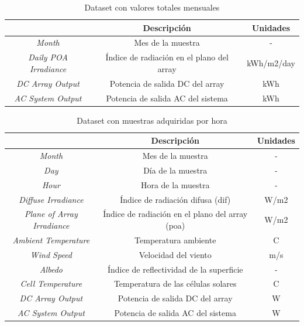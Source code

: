 \begin{table}[h!]
    \centering
    \begin{tabular}{|c|c|c|}
    \hline
    \rowcolor[HTML]{AAAAAA} 
    \multicolumn{1}{|c|}{\cellcolor[HTML]{AAAAAA}Campo} & \multicolumn{1}{c|}{\cellcolor[HTML]{AAAAAA}Descripción} & Unidades \\ \hline
    \textit{Month} & Mes de la muestra & - \\ \hline
    \textit{Daily POA Irradiance} & Índice de radiación en el plano del array & kWh/m2/day \\ \hline 
    \textit{DC Array Output} & Potencia de salida DC del array & kWh \\ \hline
    \textit{AC System Output} & Potencia de salida AC del sistema & kWh \\ \hline
    \end{tabular}
    \caption{Dataset con valores totales mensuales \cite{pvwatts}}
    \label{tab:pvwattsdataset2}
\end{table}

\vspace{1mm}

\begin{table}[h!]
    \centering
    \begin{tabular}{|c|c|c|}
    \hline
    \rowcolor[HTML]{AAAAAA} 
    \multicolumn{1}{|c|}{\cellcolor[HTML]{AAAAAA}Campo} & \multicolumn{1}{c|}{\cellcolor[HTML]{AAAAAA}Descripción} & Unidades \\ \hline
    \textit{Month} & Mes de la muestra & - \\ \hline
    \textit{Day} & Día de la muestra & - \\ \hline
    \textit{Hour} & Hora de la muestra & - \\ \hline
    \textit{Diffuse Irradiance} & Índice de radiación difusa (\gls{dif}) & W/m2 \\ \hline
    \textit{Plane of Array Irradiance} & Índice de radiación en el plano del array (\acrshort{poa}) & W/m2 \\ \hline 
    \textit{Ambient Temperature} & Temperatura ambiente & C \\ \hline
    \textit{Wind Speed} & Velocidad del viento & m/s \\ \hline
    \textit{Albedo} & Índice de reflectividad de la superficie & - \\ \hline
    \textit{Cell Temperature} & Temperatura de las células solares & C \\ \hline
    \textit{DC Array Output} & Potencia de salida DC del array & W \\ \hline
    \textit{AC System Output} & Potencia de salida AC del sistema & W \\ \hline
    \end{tabular}
    \caption{Dataset con muestras adquiridas por hora \cite{pvwatts}}
    \label{tab:pvwattsdataset}
\end{table}

